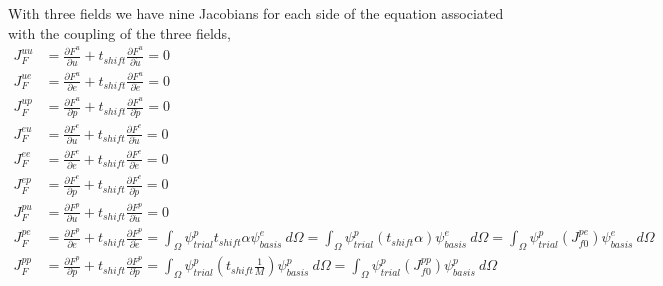 With three fields we have nine Jacobians for each side of the equation associated with the coupling of the three fields, 
\begin{align}
J_F^{uu} &= \frac{\partial F^u}{\partial u} + t_{shift} \frac{\partial F^u}{\partial \dot{u}} = 0 \\
%
J_F^{ue} &= \frac{\partial F^u}{\partial e} + t_{shift} \frac{\partial F^u}{\partial \dot{e}} = 0 \\
%
J_F^{up} &= \frac{\partial F^u}{\partial p} + t_{shift} \frac{\partial F^u}{\partial \dot{p}} = 0 \\
%
J_F^{eu} &= \frac{\partial F^e}{\partial u} + t_{shift} \frac{\partial F^e}{\partial \dot{u}} = 0 \\
%
J_F^{ee} &= \frac{\partial F^e}{\partial e} + t_{shift} \frac{\partial F^e}{\partial \dot{e}} = 0 \\
%
J_F^{ep} &= \frac{\partial F^e}{\partial p} + t_{shift} \frac{\partial F^e}{\partial \dot{p}} = 0 \\
%
J_F^{pu} &= \frac{\partial F^p}{\partial u} + t_{shift} \frac{\partial F^p}{\partial \dot{u}} = 0 \\
%
J_F^{pe} &= \frac{\partial F^p}{\partial e} + t_{shift} \frac{\partial F^p}{\partial \dot{e}} = \int_{\Omega} \psi_{trial}^p t_{shift} \alpha \psi_{basis}^e \ d\Omega = \int_{\Omega} \psi_{trial}^p (t_{shift} \alpha ) \psi_{basis}^e \ d\Omega = \int_{\Omega} \psi_{trial}^p (J_{f0}^{pe}) \psi_{basis}^e \ d\Omega \\
%
J_F^{pp} &= \frac{\partial F^p}{\partial p} + t_{shift} \frac{\partial F^p}{\partial \dot{p}} = \int_{\Omega} \psi_{trial}^p (t_{shift} \frac{1}{M}) \psi_{basis}^p \ d\Omega = \int_{\Omega} \psi_{trial}^p (J_{f0}^{pp}) \psi_{basis}^p \ d\Omega 
\end{align}

